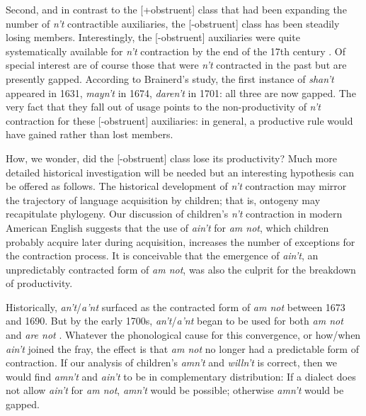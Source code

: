 \documentclass[output=paper,
modfonts
]{LSP/langsci}
\begin{document}
Second, and  in contrast to the [+obstruent] class that
had been expanding the number of \textit{n't} contractible auxiliaries,
the [-obstruent] class has been 
steadily losing members.  
Interestingly, the [-obstruent] auxiliaries were quite systematically
available for \textit{n't} contraction by the end of the 17th century
\citep{Brainerd1989}.   
Of special interest are of course those that were \textit{n't} contracted
in the past but are presently gapped. According to Brainerd's study, 
the first
instance of \textit{shan't} appeared in 1631, \textit{mayn't} in  1674, \textit{daren't} in 1701: all three are now gapped. 
 The very fact that they fall out of usage
points to the non-productivity of  \textit{  n't} contraction for these
[-obstruent] auxiliaries: 
in general, a productive rule would have gained rather than lost
members. 

How, we wonder, did the [-obstruent] class lose its productivity? Much
more detailed historical investigation will be needed but an
interesting  hypothesis can be offered as follows. The historical
development of \textit{n't} contraction may mirror the trajectory of
language acquisition by children; that is, ontogeny may recapitulate
phylogeny. Our discussion of children's \textit{n't} contraction in
modern American English suggests that the use of \textit{ain't} for \textit{am not}, which children probably acquire later during acquisition,
increases the number of exceptions for the contraction 
process. It is conceivable that the emergence  of
\textit{ain't}, an unpredictably  contracted form of \textit{am not},  
was also the culprit for the breakdown of productivity. 

Historically,  \textit{an't}/\textit{a'nt} surfaced as the contracted form
of \textit{am not} between 1673
and 1690. But by the early 1700s, \textit{an't}/\textit{a'nt} began to be
used for both \textit{am not} and \textit{are not}
\citep[][p186]{Brainerd1989}. Whatever the phonological cause for this convergence,
or how/when \textit{ain't} joined the fray, the effect is that \textit{am not} no
longer had a predictable form of contraction. If our analysis of
children's \textit{amn't} and \textit{willn't} is correct, then we would
find \textit{amn't} and \textit{ain't} to be in complementary distribution: 
If a dialect does not allow \textit{ain't} for \textit{am not}, \textit{amn't}
would be possible; otherwise \textit{amn't} would be gapped. 
\end{document}
